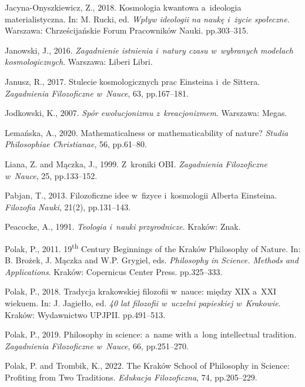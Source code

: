 Jacyna-Onyszkiewicz, Z., 2018. Kosmologia kwantowa a~ideologia materialistyczna. In: M. Rucki, ed. \textit{Wpływ ideologii na naukę i~życie społeczne}. Warszawa: Chrześcijańskie Forum Pracowników Nauki. pp.303–315.



Janowski, J., 2016. \textit{Zagadnienie istnienia i~natury czasu w~wybranych modelach kosmologicznych}. Warszawa: Liberi Libri.



Janusz, R., 2017. Stulecie kosmologicznych prac Einsteina i~de Sittera. \textit{Zagadnienia Filozoficzne w~Nauce}, 63, pp.167–181.



Jodkowski, K., 2007. \textit{Spór ewolucjonizmu z~kreacjonizmem}. Warszawa: Megas.



Lemańska, A., 2020. Mathematicalness or mathematicability of nature? \textit{Studia Philosophiae Christianae}, 56, pp.61–80.



Liana, Z. and Mączka, J., 1999. Z~kroniki OBI. \textit{Zagadnienia Filozoficzne w~Nauce}, 25, pp.133–152.



Pabjan, T., 2013. Filozoficzne idee w~fizyce i~kosmologii Alberta Einsteina. \textit{Filozofia Nauki}, 21(2), pp.131–143.



Peacocke, A., 1991. \textit{Teologia i~nauki przyrodnicze}. Kraków: Znak.



Polak, P., 2011. 19\textsuperscript{th} Century Beginnings of the Kraków Philosophy of Nature. In: B. Brożek, J. Mączka and W.P. Grygiel, eds. \textit{Philosophy in Science. Methods and Applications}. Kraków: Copernicus Center Press. pp.325–333.



Polak, P., 2018. Tradycja krakowskiej filozofii w~nauce: między XIX a~XXI wiekuem. In: J. Jagiełło, ed. \textit{40 lat filozofii w~uczelni papieskiej w~Krakowie}. Kraków: Wydawnictwo UPJPII. pp.491–513.



Polak, P., 2019. Philosophy in science: a~name with a~long intellectual tradition. \textit{Zagadnienia Filozoficzne w~Nauce}, 66, pp.251–270.



Polak, P. and Trombik, K., 2022. The Kraków School of Philosophy in Science: Profiting from Two Traditions. \textit{Edukacja Filozoficzna}, 74, pp.205–229.



